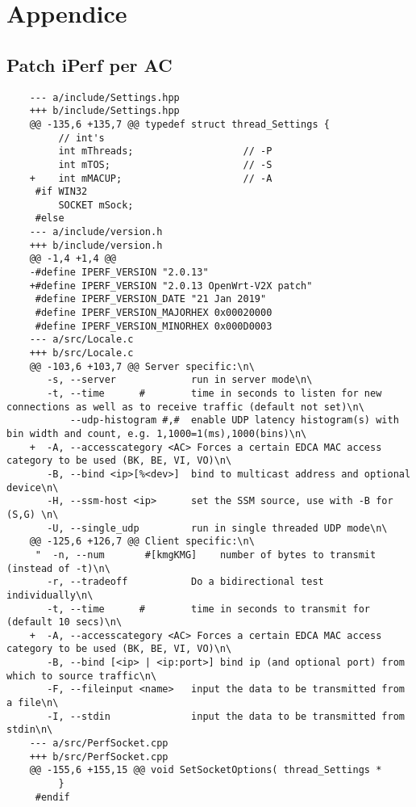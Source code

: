 \chapter{Appendice}

\section{Patch iPerf per AC}
\label{iperf_ac}
\begin{lstlisting}
    --- a/include/Settings.hpp
    +++ b/include/Settings.hpp
    @@ -135,6 +135,7 @@ typedef struct thread_Settings {
         // int's
         int mThreads;                   // -P
         int mTOS;                       // -S
    +    int mMACUP;                     // -A
     #if WIN32
         SOCKET mSock;
     #else
    --- a/include/version.h
    +++ b/include/version.h
    @@ -1,4 +1,4 @@
    -#define IPERF_VERSION "2.0.13"
    +#define IPERF_VERSION "2.0.13 OpenWrt-V2X patch"
     #define IPERF_VERSION_DATE "21 Jan 2019"
     #define IPERF_VERSION_MAJORHEX 0x00020000
     #define IPERF_VERSION_MINORHEX 0x000D0003
    --- a/src/Locale.c
    +++ b/src/Locale.c
    @@ -103,6 +103,7 @@ Server specific:\n\
       -s, --server             run in server mode\n\
       -t, --time      #        time in seconds to listen for new connections as well as to receive traffic (default not set)\n\
           --udp-histogram #,#  enable UDP latency histogram(s) with bin width and count, e.g. 1,1000=1(ms),1000(bins)\n\
    +  -A, --accesscategory <AC> Forces a certain EDCA MAC access category to be used (BK, BE, VI, VO)\n\
       -B, --bind <ip>[%<dev>]  bind to multicast address and optional device\n\
       -H, --ssm-host <ip>      set the SSM source, use with -B for (S,G) \n\
       -U, --single_udp         run in single threaded UDP mode\n\
    @@ -125,6 +126,7 @@ Client specific:\n\
     "  -n, --num       #[kmgKMG]    number of bytes to transmit (instead of -t)\n\
       -r, --tradeoff           Do a bidirectional test individually\n\
       -t, --time      #        time in seconds to transmit for (default 10 secs)\n\
    +  -A, --accesscategory <AC> Forces a certain EDCA MAC access category to be used (BK, BE, VI, VO)\n\
       -B, --bind [<ip> | <ip:port>] bind ip (and optional port) from which to source traffic\n\
       -F, --fileinput <name>   input the data to be transmitted from a file\n\
       -I, --stdin              input the data to be transmitted from stdin\n\
    --- a/src/PerfSocket.cpp
    +++ b/src/PerfSocket.cpp
    @@ -155,6 +155,15 @@ void SetSocketOptions( thread_Settings *
         }
     #endif
     

\end{lstlisting}
